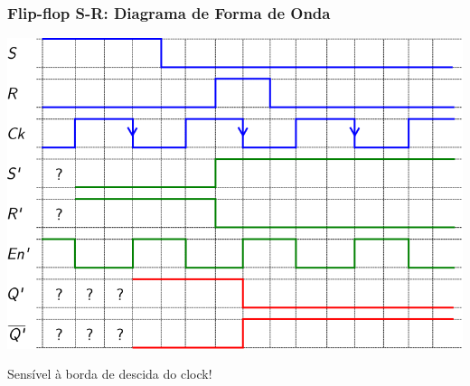\documentclass{beamer}
\begin{document}
\begin{frame}
\frametitle{Flip-flop S-R: Diagrama de Forma de Onda}

\hspace*{\fill}%
\includegraphics[scale=0.9]{images/waveformFlipflopRS}%
\hspace*{\fill}%

\vspace{-6pt}

\begin{center}
Sensível à borda de descida do clock!
\end{center}


\end{frame}
\end{document}
